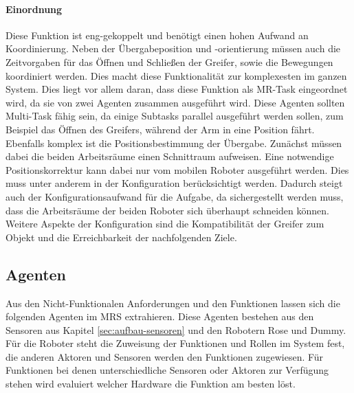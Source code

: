 \paragraph{Einordnung}
Diese Funktion ist eng-gekoppelt und benötigt einen hohen Aufwand an Koordinierung. Neben der Übergabeposition und -orientierung müssen auch die Zeitvorgaben für das Öffnen und Schließen der Greifer, sowie die Bewegungen koordiniert werden. Dies macht diese Funktionalität zur komplexesten im ganzen System. Dies liegt vor allem daran, dass diese Funktion als MR-Task eingeordnet wird, da sie von zwei Agenten zusammen ausgeführt wird. Diese Agenten sollten Multi-Task fähig sein, da einige Subtasks parallel ausgeführt werden sollen, zum Beispiel das Öffnen des Greifers, während der Arm in eine Position fährt. Ebenfalls komplex ist die Positionsbestimmung der Übergabe. Zunächst müssen dabei die beiden Arbeitsräume einen Schnittraum aufweisen. Eine notwendige Positionskorrektur kann dabei nur vom mobilen Roboter ausgeführt werden. Dies muss unter anderem in der Konfiguration berücksichtigt werden. Dadurch steigt auch der Konfigurationsaufwand für die Aufgabe, da sichergestellt werden muss, dass die Arbeitsräume der beiden Roboter sich überhaupt schneiden können. Weitere Aspekte der Konfiguration sind die Kompatibilität der Greifer zum Objekt und die Erreichbarkeit der nachfolgenden Ziele.


\subsection{Agenten}
\label{sec:agent}
Aus den Nicht-Funktionalen Anforderungen und den Funktionen lassen sich die folgenden Agenten im MRS extrahieren. Diese Agenten bestehen aus den Sensoren aus Kapitel \ref{sec:aufbau-sensoren} und den Robotern Rose und Dummy. Für die Roboter steht die Zuweisung der Funktionen und Rollen im System fest, die anderen Aktoren und Sensoren werden den Funktionen zugewiesen. Für Funktionen bei denen unterschiedliche Sensoren oder Aktoren zur Verfügung stehen wird evaluiert welcher Hardware die Funktion am besten löst.

